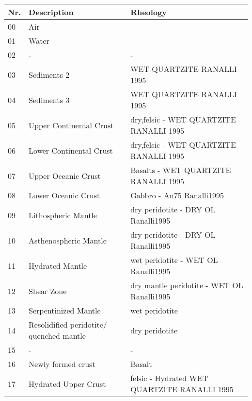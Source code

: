 \begin{table}[H]
\begin{table}[H]
\small
\centering
\begin{tabular}{l p{6cm} p{8cm}}
\toprule
Nr. & Description & Rheology\\
\midrule
\rowcolor[rgb]{1.0000    1.0000    1.0000}
00 & Air & -\\
\rowcolor[rgb]{0.5059    0.9961    0.7882}
01 & Water & -\\
\rowcolor[rgb]{1.0000    1.0000    1.0000}
02 & - &  - \\
\rowcolor[rgb]{0.6824    0.3412         0}
03 & Sediments 2 & WET QUARTZITE RANALLI 1995 \\
\rowcolor[rgb]{1.0000    0.5020         0}
04 & Sediments 3 & WET QUARTZITE RANALLI 1995 \\
\rowcolor[rgb]{0.7529    0.7529    0.7529}
05 & Upper Continental Crust & dry,felsic - WET QUARTZITE RANALLI 1995 \\
\rowcolor[rgb]{0.5020    0.5020    0.5020}
06 & Lower Continental Crust & dry,felsic - WET QUARTZITE RANALLI 1995 \\
\rowcolor[rgb]{ 0    0.5020         0}
07 & Upper Oceanic Crust & Basalts - WET QUARTZITE RANALLI 1995 \\
\rowcolor[rgb]{0    0.8431         0}
08 & Lower Oceanic Crust & Gabbro - An75 Ranalli1995 \\
\rowcolor[rgb]{0         0    0.7177}
09 & Lithospheric Mantle & dry peridotite - DRY OL Ranalli1995 \\
\rowcolor[rgb]{ 0.3216    0.2000    0.6745}
10 & Asthenospheric Mantle & dry peridotite - DRY OL Ranalli1995 \\
\rowcolor[rgb]{0.5412    0.7216    0.9922}
11 & Hydrated Mantle & wet peridotite - WET OL Ranalli1995 \\
\rowcolor[rgb]{0    0.5020    1.0000}
12 & Shear Zone & dry mantle peridotite - WET OL Ranalli1995 \\
\rowcolor[rgb]{0         0    0.4902}
13 & Serpentinized Mantle & wet peridotite \\
\rowcolor[rgb]{ 0.7000    0.1200    0.3000}
14 & Resolidified peridotite/ quenched mantle & dry peridotite \\
\rowcolor[rgb]{1.0000    1.0000    1.0000}
15 & - & - \\
\rowcolor[rgb]{0.3137    0.8941    0.2470}
16 & Newly formed crust & Basalt \\
\rowcolor[rgb]{0.5412    0.7216    0.9922}
17 & Hydrated Upper Crust & felsic - Hydrated WET QUARTZITE RANALLI 1995 \\

\end{tabular}
\end{table}
\end{table}
